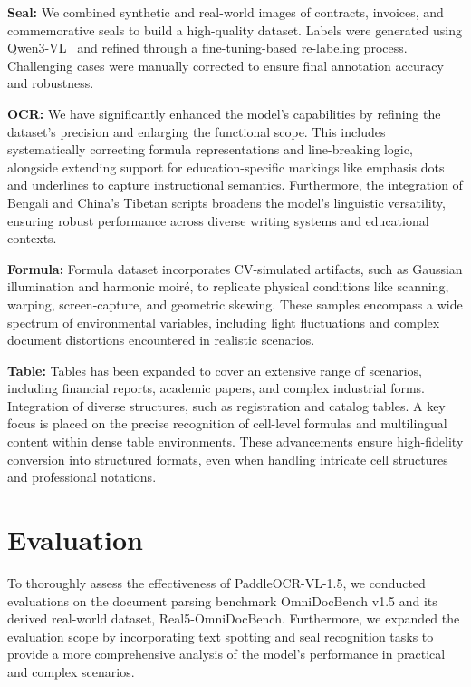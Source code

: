 \documentclass[11pt, a4paper,logo,  copyright, nonumbering]{paddleocr}
\begin{document}
\textbf{Seal:} We combined synthetic and real-world images of contracts, invoices, and commemorative seals to build a high-quality dataset. Labels were generated using Qwen3-VL~\cite{yang2025qwen3} and refined through a fine-tuning-based re-labeling process. Challenging cases were manually corrected to ensure final annotation accuracy and robustness.


\textbf{OCR:} We have significantly enhanced the model’s capabilities by refining the dataset’s precision and enlarging the functional scope. This includes systematically correcting formula representations and line-breaking logic, alongside extending support for education-specific markings like emphasis dots and underlines to capture instructional semantics. Furthermore, the integration of Bengali and China’s Tibetan scripts broadens the model’s linguistic versatility, ensuring robust performance across diverse writing systems and educational contexts.


\textbf{Formula:} Formula dataset incorporates CV-simulated artifacts, such as Gaussian illumination and harmonic moiré, to replicate physical conditions like scanning, warping, screen-capture, and geometric skewing. These samples encompass a wide spectrum of environmental variables, including light fluctuations and complex document distortions encountered in realistic scenarios.

\textbf{Table:} Tables has been expanded to cover an extensive range of scenarios, including financial reports, academic papers, and complex industrial forms. Integration of diverse structures, such as registration and catalog tables. A key focus is placed on the precise recognition of cell-level formulas and multilingual content within dense table environments. These advancements ensure high-fidelity conversion into structured formats, even when handling intricate cell structures and professional notations.


\section{Evaluation}

\label{sec:experiments} 

To thoroughly assess the effectiveness of PaddleOCR-VL-1.5, we conducted evaluations on the document parsing benchmark OmniDocBench v1.5 and its derived real-world dataset, Real5-OmniDocBench. Furthermore, we expanded the evaluation scope by incorporating text spotting and seal recognition tasks to provide a more comprehensive analysis of the model's performance in practical and complex scenarios.
\end{document}
